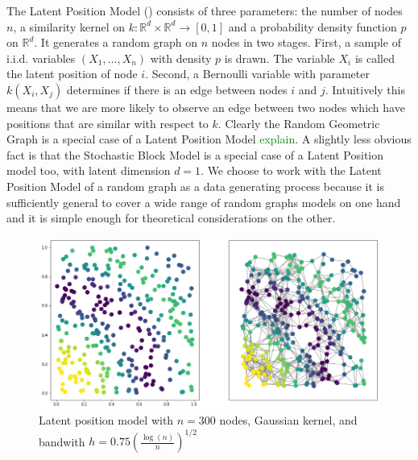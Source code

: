 \documentclass{article}
\newcommand\SB[1]{\textcolor{green}{#1}}
\begin{document}
The Latent Position Model (\cite{Hoff}) consists of three parameters:  the
number of nodes $n$, a similarity kernel on
$k\colon\mathbb{R}^d\times\mathbb{R}^d\to [0,1]$ and a probability density
function $p$ on $\mathbb{R}^d$. It generates a random graph on $n$ nodes in two
stages. First, a sample of i.i.d. variables $(X_1,...,X_n)$ with density $p$ is
drawn. The variable $X_i$ is called the latent position of node $i$. Second, a
Bernoulli variable with parameter $k(X_i,X_j)$ determines if there is an edge
between nodes $i$ and $j$. Intuitively this means that we are more likely to
observe an edge between two nodes which have positions that are similar with
respect to $k$. Clearly the Random Geometric Graph is a special case of a Latent
Position Model \SB{explain}. A slightly less obvious fact is that the Stochastic Block Model is a special case of a Latent Position model too, with latent dimension $d=1$. We choose to work with the Latent Position Model of a random graph as a data generating process because it is sufficiently general to cover a wide range of random graphs models on one hand and it is simple enough for theoretical considerations on the other.  
\begin{figure}[h!]
    \centering
    \includegraphics[width=1\textwidth]{lpm_image_correct.png}
    \caption{Latent position model with $n=300$ nodes, Gaussian kernel, and bandwith $h=0.75(\frac{\log(n)}{n})^{1/2}$}
    \label{fig:LPM_plot}
\end{figure}
\end{document}
